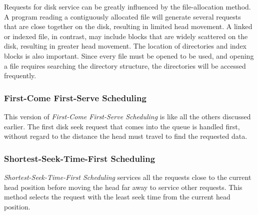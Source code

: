 Requests for disk service can be greatly influenced by the file-allocation method.
A program reading a contiguously allocated file will generate several requests that are close together on the disk, resulting in limited head movement.
A linked or indexed file, in contrast, may include blocks that are widely scattered on the disk, resulting in greater head movement.
The location of directories and index blocks is also important.
Since every file must be opened to be used, and opening a file requires searching the directory structure, the directories will be accessed frequently.

\subsubsection{First-Come First-Serve Scheduling}\label{subsubsec:FCFS_Disk_Scheduling}
This version of \emph{First-Come First-Serve Scheduling} is like all the others discussed earlier.
The first disk seek request that comes into the queue is handled first, without regard to the distance the head must travel to find the requested data.

\subsubsection{Shortest-Seek-Time-First Scheduling}\label{subsubsec:SSTF_Disk_Scheduling}
\emph{Shortest-Seek-Time-First Scheduling} services all the requests close to the current head position before moving the head far away to service other requests.
This method selects the request with the least seek time from the current head position.


